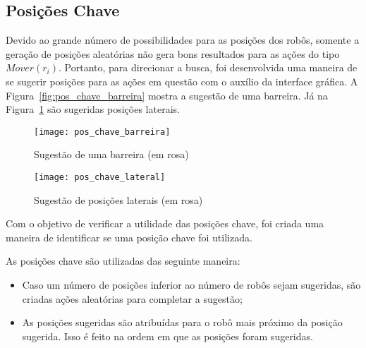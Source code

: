 \subsection{Posições Chave}\label{subsec:pos_chave}

Devido ao grande número de possibilidades para as posições dos robôs, somente a
geração de posições aleatórias não gera bons resultados para as ações do tipo
$Mover(r_i)$. Portanto, para direcionar a busca, foi desenvolvida uma maneira de
se sugerir posições para as ações em questão com o auxílio da interface gráfica.
A Figura~\ref{fig:pos_chave_barreira} mostra a sugestão de uma barreira.  Já na
Figura~\ref{fig:pos_chave_lateral} são sugeridas posições laterais.

\begin{figure}[H]
  \centering
  \texttt{[image: pos\_chave\_barreira]}
  \caption{Sugestão de uma barreira (em rosa)}\label{fig:pos_chave_barreira}
  \texttt{[image: pos\_chave\_lateral]}
  \caption{Sugestão de posições laterais (em rosa)}\label{fig:pos_chave_lateral}
\end{figure}

Com o objetivo de verificar a utilidade das posições chave, foi criada uma
maneira de identificar se uma posição chave foi utilizada.

As posições chave são utilizadas das seguinte maneira:
\begin{itemize}
  \item Caso um número de posições inferior ao número de robôs sejam sugeridas,
    são criadas ações aleatórias para completar a sugestão;
  \item As posições sugeridas são atribuídas para o robô mais próximo da posição
    sugerida. Isso é feito na ordem em que as posições foram sugeridas.
\end{itemize}

